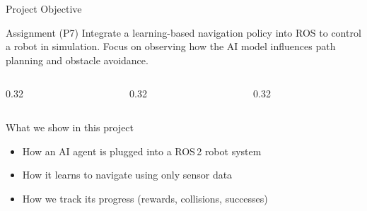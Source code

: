 \documentclass[aspectratio=169, 11pt]{beamer}
\begin{document}
\begin{frame}{Project Objective}

  \begin{alertblock}{Assignment (P7)}
    Integrate a learning-based navigation policy into ROS to control
    a robot in simulation. Focus on observing how the AI model influences
    path planning and obstacle avoidance.
  \end{alertblock}

  \vspace{0.5em}

  \begin{columns}[T]
    \begin{column}{0.32\textwidth}
      \centering
    \end{column}
    \begin{column}{0.32\textwidth}
      \centering
    \end{column}
    \begin{column}{0.32\textwidth}
      \centering
    \end{column}
  \end{columns}

  \vspace{0.5em}

  \begin{block}{What we show in this project}
    \begin{itemize}
      \item How an AI agent is plugged into a ROS\,2 robot system
      \item How it learns to navigate using only sensor data
      \item How we track its progress (rewards, collisions, successes)
    \end{itemize}
  \end{block}
\end{frame}
\end{document}

